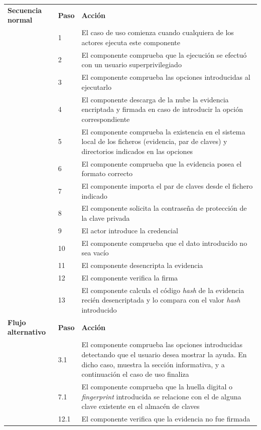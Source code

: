 \documentclass[12pt,a4paper, twoside]{report}
\begin{document}
\begin{longtable}{|p{3cm}|p{1cm}|p{12.5cm}|}
		\multirow{0}{3cm}{\cellcolor{Gainsboro}\textbf{Secuencia normal}} & \textbf{Paso} & \textbf{Acción}  \\ \cline{2-3} 
		\cellcolor{Gainsboro} & 1 & El caso de uso comienza cuando cualquiera de los actores ejecuta este componente \\ \cline{2-3} 
		\cellcolor{Gainsboro} & 2 & El componente comprueba que la ejecución se efectuó con un usuario superprivilegiado \\ \cline{2-3} 
		\cellcolor{Gainsboro} & 3 & El componente comprueba las opciones introducidas al ejecutarlo \\ \cline{2-3} 
		\cellcolor{Gainsboro} & 4 & El componente descarga de la nube la evidencia encriptada y firmada en caso de introducir la opción correspondiente \\ \cline{2-3} 
		\cellcolor{Gainsboro} & 5 & El componente comprueba la existencia en el sistema local de los ficheros (evidencia, par de claves) y directorios indicados en las opciones \\ \cline{2-3} 
		\cellcolor{Gainsboro} & 6 & El componente comprueba que la evidencia posea el formato correcto \\ \cline{2-3} 
		\cellcolor{Gainsboro} & 7 & El componente importa el par de claves desde el fichero indicado \\ \cline{2-3} 
		\cellcolor{Gainsboro} & 8 & El componente solicita la contraseña de protección de la clave privada \\ \cline{2-3} 
		\cellcolor{Gainsboro} & 9 & El actor introduce la credencial \\ \cline{2-3} 
		\cellcolor{Gainsboro} & 10 & El componente comprueba que el dato introducido no sea vacío \\ \cline{2-3} 
		\cellcolor{Gainsboro} & 11 & El componente desencripta la evidencia \\ \cline{2-3} 
		\cellcolor{Gainsboro} & 12 & El componente verifica la firma \\ \cline{2-3} 
		\cellcolor{Gainsboro} & 13 & El componente calcula el código \textit{hash} de la evidencia recién desencriptada y lo compara con el valor \textit{hash} introducido \\ \hline

		\multirow{0}{3.2cm}{\cellcolor{Gainsboro}\textbf{Flujo alternativo}} & \textbf{Paso} & \textbf{Acción} \\ \cline{2-3} 
		
		\cellcolor{Gainsboro} & 3.1 & El componente comprueba las opciones introducidas detectando que el usuario desea mostrar la ayuda. En dicho caso, muestra la sección informativa, y a continuación el caso de uso finaliza \\ \cline{2-3} 
		\cellcolor{Gainsboro} & 7.1 & El componente comprueba que la huella digital o \textit{fingerprint} introducida se relacione con el de alguna clave existente en el almacén de claves \\ \cline{2-3} 
		\cellcolor{Gainsboro} & 12.1 & El componente verifica que la evidencia no fue firmada \\ \hline


\end{longtable}
\end{document}
